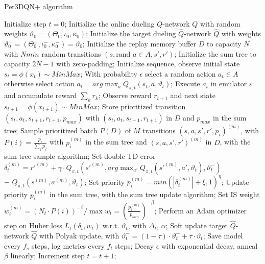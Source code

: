 \begin{algorithm}[H]
\small
\caption*{Per3DQN+ algorithm}
\begin{algorithmic}
    \STATE Initialize step $t = 0$;
    \STATE Initialize the online dueling $Q$-network $Q$ with random weights $\vartheta_0 = (\Theta_0, \iota_0,\kappa_0)$;
    \STATE Initialize the target dueling $\hat{Q}$-network $\hat{Q}$ with weights $\vartheta^-_0 =  (\Theta^-_0, \iota^-_0,\kappa^-_0) = \vartheta_0$;
    \STATE Initialize the replay memory buffer $D$ to capacity $N$
    \STATE with $Nmin$ random transitions $(s,\text{rand }a \in A,s',r')$;
    \STATE Initialize the sum tree to capacity $2N - 1$ with zero-padding;
        \bindent
        \STATE Initialize sequence, observe initial state $s_t=\phi(x_t) \sim MinMax$;
            \bindent
            \STATE With probability $\epsilon$ select a random action $a_t \in A$
            \STATE otherwise select action $a_t = arg\max_{a}Q_{\pi,t}(s_t,a,\vartheta_t)$;
                \bindent
                Execute $a_t$ in emulator $\varepsilon$ and accumulate reward $\sum_k r_k$;
                \eindent
            \ENDFOR
            \STATE Observe reward $r_{t+1}$ and next state $s_{t+1}=\phi(x_{t+1}) \sim MinMax$;
            \STATE Store prioritized transition $(s_t,a_t,s_{t+1},r_{t+1}, p_{max})$
            \STATE with $(s_t,a_t,s_{t+1},r_{t+1})$ in $D$ and $p_{max}$ in the sum tree;
            \STATE Sample prioritized batch $P(D)$ of $M$ transitions $(s,a,s',r',p_i)^{(m)}$, with $P(i) = \frac{p_i}{\sum_j p_j}$
            \STATE with $p_i^{(m)}$ in the sum tree and $(s,a,s',r')^{(m)}$ in $D$, with the sum tree sample algorithm;
                \bindent
                \STATE Set double TD error $\delta^{(m)}_t = r'^{(m)} + \gamma \cdot Q_{\pi,t}(s'^{(m)},arg\max_{a'}Q_{\pi,t}(s'^{(m)},a',\vartheta_t),\vartheta^-_t)$ \\ \;\;\;\;\;\;\;\;\;\;\;\;\;\;\;\;\;\;\;\;\;\;\;\;\;\;\;\;\;\;\;\;\;\;\;\;\;\;\;\;\;\;\;
                $-$ $Q_{\pi,t}(s^{(m)},a^{(m)},\vartheta_t)$;
                \STATE Set priority $p_i^{(m)}= min(|\delta^{(m)}_t| + \xi, 1)^{\eta}$;
                \STATE Update priority $p_i^{(m)}$ in the sum tree, with the sum tree update algorithm;
                \STATE Set IS weight $w_{t}^{(m)} = (N_t \cdot P(i))^{-\beta} / \max w_{t} = (\frac{p_i^{(m)}}{p_{min}})^{-\beta}$;
                \eindent
            \ENDFOR
            \STATE Perform an Adam optimizer step on Huber loss $L_t(\delta_t,w_t)$ w.r.t. $\vartheta_t$, with $\Delta_t$, $\alpha$;
            \STATE Soft update target $\hat{Q}$-network $\hat{Q}$ with Polyak update, with $\vartheta^-_t = (1-\tau) \cdot \vartheta^-_t + \tau \cdot \vartheta_t$;
            \STATE Save model every $f_s$ steps, log metrics every $f_l$ steps;
            \STATE Decay $\epsilon$ with exponential decay, anneal $\beta$ linearly;
            \STATE Increment step $t = t + 1$;
            \eindent
        \ENDWHILE
        \eindent
    \ENDFOR
\end{algorithmic}
\end{algorithm}

